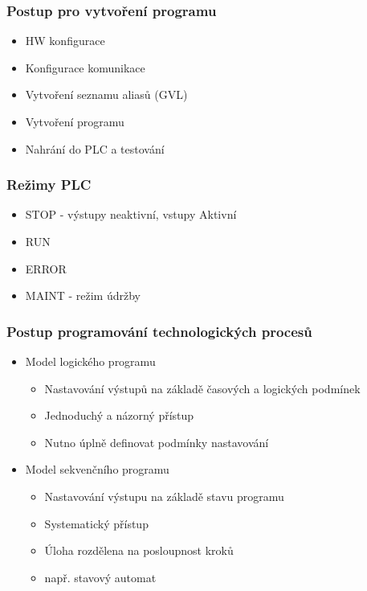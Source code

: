 \subsubsection*{Postup pro vytvoření programu}
\begin{itemize}
    \item HW konfigurace
    \item Konfigurace komunikace
    \item Vytvoření seznamu aliasů (GVL)
    \item Vytvoření programu
    \item Nahrání do PLC a testování
\end{itemize}

\subsubsection*{Režimy PLC}
\begin{itemize}
    \item STOP - výstupy neaktivní, vstupy Aktivní
    \item RUN
    \item ERROR
    \item MAINT - režim údržby
\end{itemize}

\subsubsection*{Postup programování technologických procesů}
\begin{itemize}
    \item Model logického programu \begin{itemize}
              \item Nastavování výstupů na základě časových a logických podmínek
              \item Jednoduchý a názorný přístup
              \item Nutno úplně definovat podmínky nastavování
          \end{itemize}
    \item Model sekvenčního programu \begin{itemize}
              \item Nastavování výstupu na základě stavu programu
              \item Systematický přístup
              \item Úloha rozdělena na posloupnost kroků
              \item např. stavový automat
          \end{itemize}
\end{itemize}

